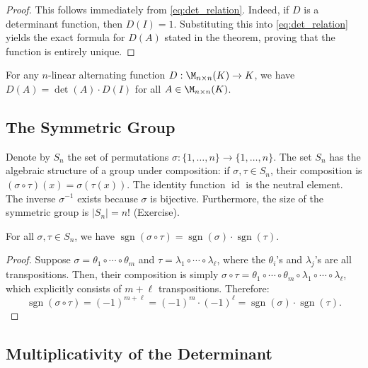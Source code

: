\begin{proof}
  This follows immediately from \eqref{eq:det_relation}. Indeed, if $D$ is a determinant function, then $D(I) = 1$. Substituting this into \eqref{eq:det_relation} yields the exact formula for $D(A)$ stated in the theorem, proving that the function is entirely unique.
\end{proof}

\begin{corollary}
  \label{cor:det_pullout}
  For any $n$-linear alternating function $D : \M_{n \times n}(K) \to K$, we have $D(A) = \det(A) \cdot D(I)$ for all $A \in \M_{n \times n}(K)$.
\end{corollary}

\subsection{The Symmetric Group}

Denote by $S_n$ the set of permutations $\sigma : \{1, \dots, n\} \to \{1, \dots, n\}$. The set $S_n$ has the algebraic structure of a group under composition: if $\sigma, \tau \in S_n$, their composition is $(\sigma \circ \tau)(x) = \sigma(\tau(x))$. The identity function $\operatorname{id}$ is the neutral element. The inverse $\sigma^{-1}$ exists because $\sigma$ is bijective. Furthermore, the size of the symmetric group is $|S_n| = n!$ (Exercise).

\begin{lemma}
  \label{lem:sgn_multiplicative}
  For all $\sigma, \tau \in S_n$, we have $\operatorname{sgn}(\sigma \circ \tau) = \operatorname{sgn}(\sigma) \cdot \operatorname{sgn}(\tau)$.
\end{lemma}

\begin{proof}
  Suppose $\sigma = \theta_1 \circ \cdots \circ \theta_m$ and $\tau = \lambda_1 \circ \cdots \circ \lambda_{\ell}$, where the $\theta_i$'s and $\lambda_j$'s are all transpositions. Then, their composition is simply $\sigma \circ \tau = \theta_1 \circ \cdots \circ \theta_m \circ \lambda_1 \circ \cdots \circ \lambda_{\ell}$, which explicitly consists of $m + \ell$ transpositions. Therefore:
  \[
  \operatorname{sgn}(\sigma \circ \tau) = (-1)^{m+\ell} = (-1)^m \cdot (-1)^{\ell} = \operatorname{sgn}(\sigma) \cdot \operatorname{sgn}(\tau).
  \]
\end{proof}

\subsection{Multiplicativity of the Determinant}

